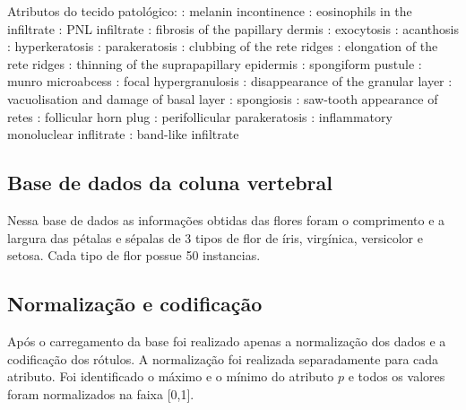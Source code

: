 \documentclass[ 
	article,			%
	11pt,				%
	oneside,			%
	a4paper,			%
	english,			%
	brazil,				%
	]{abntex2}
\begin{document}
Atributos do tecido patológico: : melanin incontinence : eosinophils in the infiltrate : PNL infiltrate : fibrosis of the papillary dermis : exocytosis : acanthosis : hyperkeratosis : parakeratosis : clubbing of the rete ridges : elongation of the rete ridges : thinning of the suprapapillary epidermis : spongiform pustule : munro microabcess : focal hypergranulosis : disappearance of the granular layer : vacuolisation and damage of basal layer : spongiosis : saw-tooth appearance of retes : follicular horn plug : perifollicular parakeratosis : inflammatory monoluclear inflitrate : band-like infiltrate\newline

\subsection{Base de dados da coluna vertebral}

Nessa base de dados as informações obtidas das flores foram o comprimento e a largura das
pétalas e sépalas de 3 tipos de flor de íris, virgínica, versicolor e setosa.
Cada tipo de flor possue 50 instancias.



\subsection{Normalização e codificação}
\label{ss:normCodf} 
Após o carregamento da base foi realizado apenas a normalização dos dados e a
codificação dos rótulos. A normalização foi realizada separadamente para cada
atributo. Foi identificado o máximo e o mínimo do atributo $p$ e todos os
valores foram normalizados na faixa [0,1].
\end{document}
